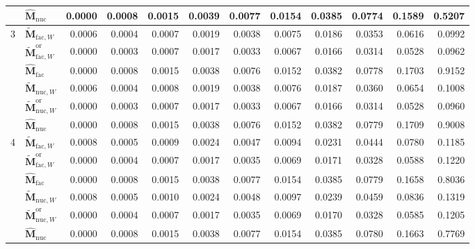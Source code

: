\documentclass[numsec,webpdf,modern,large,namedate]{oup-authoring-template}
\theoremstyle{plain}
\theoremstyle{remark}
\newcommand{\M}{\bm{M}}
\begin{document}
\begin{table}[!htbp]
{\begin{tabular}{@{}llrrrrrrrrrr@{}}
 & $\widehat{\M}_{\mathrm{nuc}}$ & 0.0000 & 0.0008 & 0.0015 & 0.0039 & 0.0077 & 0.0154 & 0.0385 & 0.0774 & 0.1589 & 0.5207 \\
\midrule
\multirow{6}{*}{3} & $\widetilde{\M}_{\mathrm{fac},W}$ & 0.0006 & 0.0004 & 0.0007 & 0.0019 & 0.0038 & 0.0075 & 0.0186 & 0.0353 & 0.0616 & 0.0992 \\
 & $\widetilde{\M}_{\mathrm{fac},W}^{\mathrm{or}}$ & 0.0000 & 0.0003 & 0.0007 & 0.0017 & 0.0033 & 0.0067 & 0.0166 & 0.0314 & 0.0528 & 0.0962 \\
 & $\widehat{\M}_{\mathrm{fac}}$ & 0.0000 & 0.0008 & 0.0015 & 0.0038 & 0.0076 & 0.0152 & 0.0382 & 0.0778 & 0.1703 & 0.9152 \\
 & $\widetilde{\M}_{\mathrm{nuc},W}$ & 0.0006 & 0.0004 & 0.0008 & 0.0019 & 0.0038 & 0.0076 & 0.0187 & 0.0360 & 0.0654 & 0.1008 \\
 & $\widetilde{\M}_{\mathrm{nuc},W}^{\mathrm{or}}$ & 0.0000 & 0.0003 & 0.0007 & 0.0017 & 0.0033 & 0.0067 & 0.0166 & 0.0314 & 0.0528 & 0.0960 \\
 & $\widehat{\M}_{\mathrm{nuc}}$ & 0.0000 & 0.0008 & 0.0015 & 0.0038 & 0.0076 & 0.0152 & 0.0382 & 0.0779 & 0.1709 & 0.9008 \\
\midrule
\multirow{6}{*}{4} & $\widetilde{\M}_{\mathrm{fac},W}$ & 0.0008 & 0.0005 & 0.0009 & 0.0024 & 0.0047 & 0.0094 & 0.0231 & 0.0444 & 0.0780 & 0.1185 \\
 & $\widetilde{\M}_{\mathrm{fac},W}^{\mathrm{or}}$ & 0.0000 & 0.0004 & 0.0007 & 0.0017 & 0.0035 & 0.0069 & 0.0171 & 0.0328 & 0.0588 & 0.1220 \\
 & $\widehat{\M}_{\mathrm{fac}}$ & 0.0000 & 0.0008 & 0.0015 & 0.0038 & 0.0077 & 0.0154 & 0.0385 & 0.0779 & 0.1658 & 0.8036 \\
 & $\widetilde{\M}_{\mathrm{nuc},W}$ & 0.0008 & 0.0005 & 0.0010 & 0.0024 & 0.0048 & 0.0097 & 0.0239 & 0.0459 & 0.0836 & 0.1319 \\
 & $\widetilde{\M}_{\mathrm{nuc},W}^{\mathrm{or}}$ & 0.0000 & 0.0004 & 0.0007 & 0.0017 & 0.0035 & 0.0069 & 0.0170 & 0.0328 & 0.0585 & 0.1205 \\
 & $\widehat{\M}_{\mathrm{nuc}}$ & 0.0000 & 0.0008 & 0.0015 & 0.0038 & 0.0077 & 0.0154 & 0.0385 & 0.0780 & 0.1663 & 0.7769 \\
\bottomrule
\end{tabular}
}
\endgroup
\end{table}
\end{document}
